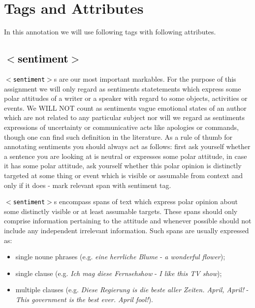 \documentclass[11pt,a4paper]{article}
\newcommand{\xmltag}[1]{\textcolor{black}{{\small$<$#1$>$}}}
\begin{document}
\section{Tags and Attributes}
In this annotation we will use following tags with following
attributes.


\subsection{\xmltag{sentiment}}
\texttt{\xmltag{sentiment}}s are our most important markables.  For
the purpose of this assignment we will only regard as sentiments
statetements which express some polar attitudes of a writer or a
speaker with regard to some objects, activities or events. We WILL NOT
count as sentiments vague emotional states of an author which are not
related to any particular subject nor will we regard as sentiments
expressions of uncertainty or communicative acts like apologies or
commands, though one can find such definition in the literature. As a
rule of thumb for annotating sentiments you should always act as
follows: first ask yourself whether a sentence you are looking at is
neutral or expresses some polar attitude, in case it has some polar
attitude, ask yourself whether this polar opinion is distinctly
targeted at some thing or event which is visible or assumable from
context and only if it does - mark relevant span with sentiment tag.

\texttt{\xmltag{sentiment}}s encompass spans of text which express
polar opinion about some distinctly visible or at least assumable
targets. These spans should only comprise information pertaining to
the attitude and whenever possible should not include any independent
irrelevant information. Such spans are usually expressed as:
\begin{itemize}
  \item single noune phrases (e.g. \textit{eine herrliche Blume} -
    \textit{a wonderful flower});
  \item single clause (e.g. \textit{Ich mag diese Fernsehshow} -
    \textit{I like this TV show});
  \item multiple clauses (e.g. \textit{Diese Regierung is die beste
    aller Zeiten. April, April!} - \textit{This government is the best
    ever. April fool!}).
\end{itemize}
\end{document}
